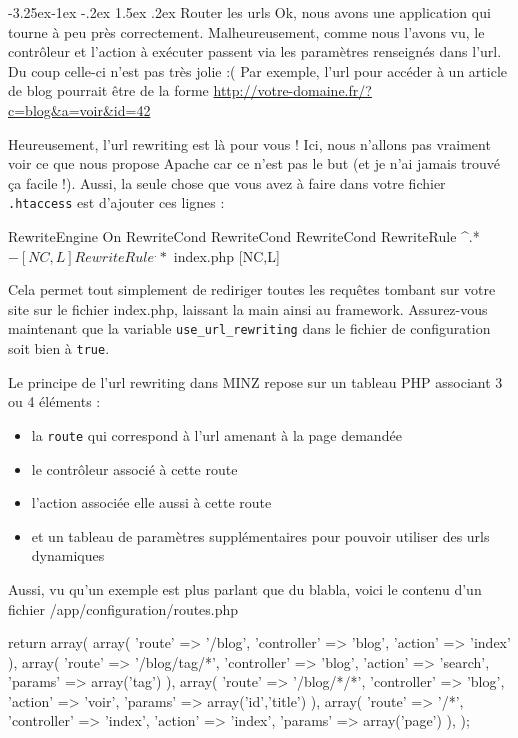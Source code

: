 \documentclass[a4paper,11pt]{article}
\makeatletter
\renewcommand{\subsection}{\@startsection{subsection}{2}{\z@}%
             {-3.25ex\@plus -1ex \@minus -.2ex}%
             {1.5ex \@plus .2ex}%
             {\color{bleuFonce}\normalfont\large\bfseries}}
\makeatother
\begin{document}
\subsection{Router les urls}
Ok, nous avons une application qui tourne à peu près correctement. Malheureusement, comme nous l'avons vu, le contrôleur et l'action à exécuter passent via les paramètres renseignés dans l'url. Du coup celle-ci n'est pas très jolie :( Par exemple, l'url pour accéder à un article de blog pourrait être de la forme \url{http://votre-domaine.fr/?c=blog&a=voir&id=42}

Heureusement, l'url rewriting est là pour vous ! Ici, nous n'allons pas vraiment voir ce que nous propose Apache car ce n'est pas le but (et je n'ai jamais trouvé ça facile !). Aussi, la seule chose que vous avez à faire dans votre fichier \texttt{.htaccess} est d'ajouter ces lignes :
\begin{htaccess}
RewriteEngine On
RewriteCond %
RewriteCond %
RewriteCond %
RewriteRule ^.*$ - [NC,L]
RewriteRule ^.*$ index.php [NC,L]
\end{htaccess}

Cela permet tout simplement de rediriger toutes les requêtes tombant sur votre site sur le fichier index.php, laissant la main ainsi au framework. Assurez-vous maintenant que la variable \texttt{use\_url\_rewriting} dans le fichier de configuration soit bien à \texttt{true}.

Le principe de l'url rewriting dans MINZ repose sur un tableau PHP associant 3 ou 4 éléments :
\begin{itemize}
  \item la \texttt{route} qui correspond à l'url amenant à la page demandée
  \item le contrôleur associé à cette route
  \item l'action associée elle aussi à cette route
  \item et un tableau de paramètres supplémentaires pour pouvoir utiliser des urls dynamiques
\end{itemize}

Aussi, vu qu'un exemple est plus parlant que du blabla, voici le contenu d'un fichier /app/configuration/routes.php
\begin{PHP}
return array(
  array(
    'route'       => '/blog',
    'controller'  => 'blog',
    'action'      => 'index'
  ),
  array(
    'route'       => '/blog/tag/*',
    'controller'  => 'blog',
    'action'      => 'search',
    'params'      => array('tag')
  ),
  array(
    'route'       => '/blog/*/*',
    'controller'  => 'blog',
    'action'      => 'voir',
    'params'      => array('id','title')
  ),
  array(
    'route'       => '/*',
    'controller'  => 'index',
    'action'      => 'index',
    'params'      => array('page')
    ),
);
\end{PHP}
\end{document}
